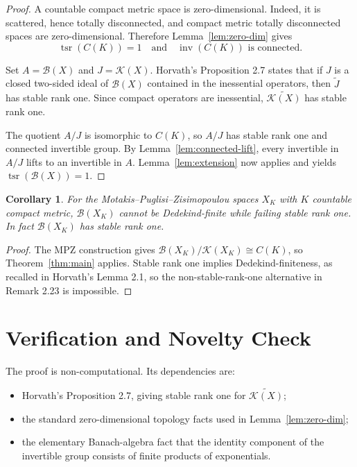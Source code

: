 \documentclass[11pt]{amsart}
\newtheorem{corollary}{Corollary}
\newcommand{\B}{\mathcal B}
\newcommand{\K}{\mathcal K}
\newcommand{\inv}{\operatorname{inv}}
\newcommand{\tsr}{\operatorname{tsr}}
\begin{document}
\begin{proof}
A countable compact metric space is zero-dimensional.  Indeed, it is
scattered, hence totally disconnected, and compact metric totally disconnected
spaces are zero-dimensional.  Therefore Lemma~\ref{lem:zero-dim} gives
\[
        \tsr(C(K))=1
        \quad\text{and}\quad
        \inv(C(K)) \text{ is connected}.
\]

Set \(A=\B(X)\) and \(J=\K(X)\).  Horvath's Proposition 2.7 states that if
\(J\) is a closed two-sided ideal of \(\B(X)\) contained in the inessential
operators, then \(\widetilde J\) has stable rank one.  Since compact operators
are inessential, \(\widetilde{\K(X)}\) has stable rank one.

The quotient \(A/J\) is isomorphic to \(C(K)\), so \(A/J\) has stable rank one
and connected invertible group.  By Lemma~\ref{lem:connected-lift}, every
invertible in \(A/J\) lifts to an invertible in \(A\).  Lemma~\ref{lem:extension}
now applies and yields \(\tsr(\B(X))=1\).
\end{proof}

\begin{corollary}
For the Motakis--Puglisi--Zisimopoulou spaces \(X_K\) with \(K\) countable
compact metric, \(\B(X_K)\) cannot be Dedekind-finite while failing stable
rank one.  In fact \(\B(X_K)\) has stable rank one.
\end{corollary}

\begin{proof}
The MPZ construction gives \(\B(X_K)/\K(X_K)\cong C(K)\), so
Theorem~\ref{thm:main} applies.  Stable rank one implies Dedekind-finiteness,
as recalled in Horvath's Lemma 2.1, so the non-stable-rank-one alternative in
Remark 2.23 is impossible.
\end{proof}

\section{Verification and Novelty Check}

The proof is non-computational.  Its dependencies are:
\begin{itemize}
\item Horvath's Proposition 2.7, giving stable rank one for
      \(\widetilde{\K(X)}\);
\item the standard zero-dimensional topology facts used in
      Lemma~\ref{lem:zero-dim};
\item the elementary Banach-algebra fact that the identity component of the
      invertible group consists of finite products of exponentials.
\end{itemize}
\end{document}
